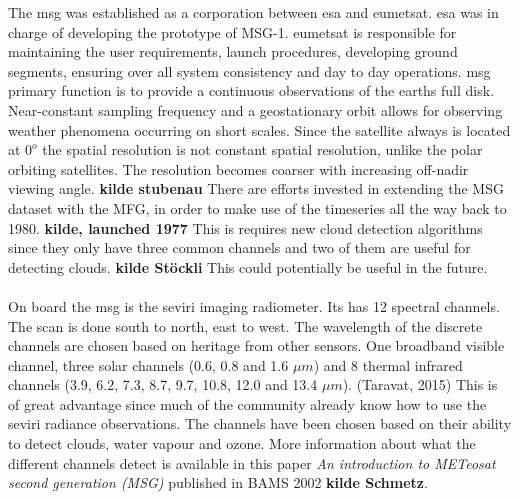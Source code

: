 The \acrfull{msg} was established as a corporation between \acrfull{esa} and \acrfull{eumetsat}. \acrshort{esa} was in charge of developing the prototype of MSG-1. \acrshort{eumetsat} is responsible for maintaining the user requirements, launch procedures, developing ground segments, ensuring over all system consistency and day to day operations.  \acrshort{msg} primary function is to provide a continuous observations of the earths full disk. Near-constant sampling frequency and a geostationary orbit allows for observing weather phenomena occurring on short scales. Since the satellite always is located at $0^o$ the spatial resolution is not constant spatial resolution, unlike the polar orbiting satellites. The resolution becomes coarser with increasing off-nadir viewing angle. \textbf{kilde stubenau} There are efforts invested in extending the MSG dataset with the MFG, in order to make use of the timeseries all the way back to 1980. \textbf{kilde, launched 1977} This is requires new cloud detection algorithms since they only have three common channels and two of them are useful for detecting clouds. \textbf{kilde Stöckli} This could potentially be useful in the future. 
\\ \\ 
On board the \acrshort{msg} is the \acrfull{seviri} imaging radiometer. Its has  12 spectral channels. The scan is done south to north, east to west. The wavelength of the discrete channels are chosen based on heritage from other sensors. One broadband visible channel, three solar channels (0.6, 0.8 and 1.6 $\mu m$) and 8 thermal infrared channels (3.9, 6.2, 7.3, 8.7, 9.7, 10.8, 12.0 and 13.4 $\mu m$). (Taravat, 2015)  This is of great advantage since much of the community already know how to use the \acrshort{seviri} radiance observations. The channels have been chosen based on their ability to detect clouds, water vapour and ozone. More information about what the different channels detect is available in this paper \textit{An introduction to METeosat second generation (MSG)} published in BAMS 2002 \textbf{kilde Schmetz}. %
